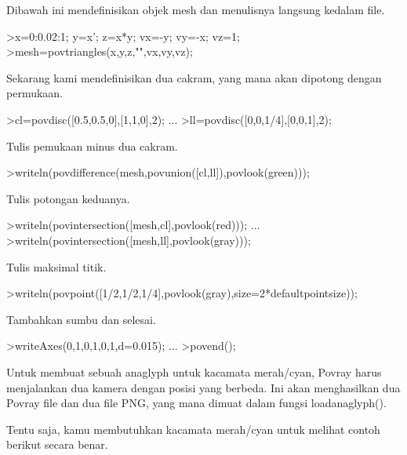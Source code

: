\documentclass[a4paper,10pt]{article}
\begin{document}
\begin{eulernotebook}
\begin{eulercomment}
Dibawah ini mendefinisikan objek mesh dan menulisnya langsung kedalam
file.
\end{eulercomment}
\begin{eulerprompt}
>x=0:0.02:1; y=x'; z=x*y; vx=-y; vy=-x; vz=1;
>mesh=povtriangles(x,y,z,"",vx,vy,vz);
\end{eulerprompt}
\begin{eulercomment}
Sekarang kami mendefinisikan dua cakram, yang mana akan dipotong
dengan permukaan.
\end{eulercomment}
\begin{eulerprompt}
>cl=povdisc([0.5,0.5,0],[1,1,0],2); ...
>ll=povdisc([0,0,1/4],[0,0,1],2);
\end{eulerprompt}
\begin{eulercomment}
Tulis pemukaan minus dua cakram.
\end{eulercomment}
\begin{eulerprompt}
>writeln(povdifference(mesh,povunion([cl,ll]),povlook(green)));
\end{eulerprompt}
\begin{eulercomment}
Tulis potongan keduanya.
\end{eulercomment}
\begin{eulerprompt}
>writeln(povintersection([mesh,cl],povlook(red))); ...
>writeln(povintersection([mesh,ll],povlook(gray)));
\end{eulerprompt}
\begin{eulercomment}
Tulis maksimal titik.
\end{eulercomment}
\begin{eulerprompt}
>writeln(povpoint([1/2,1/2,1/4],povlook(gray),size=2*defaultpointsize));
\end{eulerprompt}
\begin{eulercomment}
Tambahkan sumbu dan selesai.
\end{eulercomment}
\begin{eulerprompt}
>writeAxes(0,1,0,1,0,1,d=0.015); ...
>povend();
\end{eulerprompt}
\begin{eulercomment}
Untuk membuat sebuah anaglyph untuk kacamata merah/cyan, Povray harus
menjalankan dua kamera dengan posisi yang berbeda. Ini akan
menghasilkan dua Povray file dan dua file PNG, yang mana dimuat dalam
fungsi loadanaglyph().

Tentu saja, kamu membutuhkan kacamata merah/cyan untuk melihat contoh
berikut secara benar.


\end{eulercomment}
\end{eulernotebook}
\end{document}
